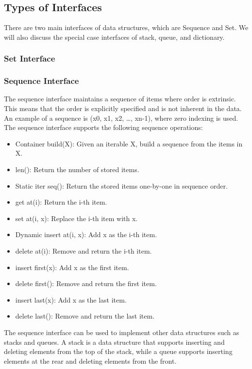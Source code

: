 \documentclass[a4paper, 11pt, oneside]{book} %
\begin{document}
\subsection{Types of Interfaces}
There are two main interfaces of data structures, which are Sequence and Set. We will also discuss the special case interfaces of stack, queue, and dictionary.

\subsubsection{Set Interface}



\subsubsection{Sequence Interface}
The sequence interface maintains a sequence of items where order is extrinsic. This means that the order is explicitly specified and is not inherent in the data. An example of a sequence is (x0, x1, x2, …, xn-1), where zero indexing is used. The sequence interface supports the following sequence operations:

\begin{itemize}
    \item Container build(X): Given an iterable X, build a sequence from the items in X.
    \item len(): Return the number of stored items.
    \item Static iter seq(): Return the stored items one-by-one in sequence order.
    \item get at(i): Return the i-th item.
    \item set at(i, x): Replace the i-th item with x.
    \item Dynamic insert at(i, x): Add x as the i-th item.
    \item delete at(i): Remove and return the i-th item.
    \item insert first(x): Add x as the first item.
    \item delete first(): Remove and return the first item.
    \item insert last(x): Add x as the last item.
    \item delete last(): Remove and return the last item.
\end{itemize}

The sequence interface can be used to implement other data structures such as stacks and queues. A stack is a data structure that supports inserting and deleting elements from the top of the stack, while a queue supports inserting elements at the rear and deleting elements from the front.
\end{document}
